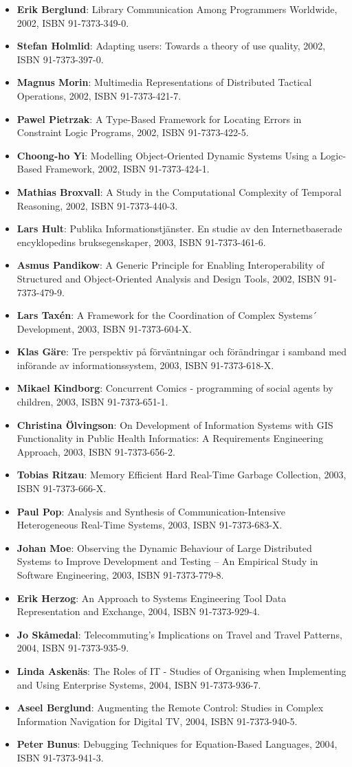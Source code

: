 \documentclass[a4paper,showtrims,twocolumn]{memoir}
\newenvironment{theses}
  {
    \begin{itemize}
      \setlength{\itemsep}{0.2em}
      \setlength{\parskip}{0em}
      \setlength{\parsep}{0em}
  }
  {
    \end{itemize}
  }
\newcommand{\thesis}[5]{\item[No. #1] \textbf{#2}: #3, #4, ISBN #5.}
\begin{document}
\begin{theses}
    \thesis{758}{Erik Berglund}{Library Communication Among Programmers Worldwide}{2002}{91-7373-349-0}
    \thesis{765}{Stefan Holmlid}{Adapting users: Towards a theory of use quality}{2002}{91-7373-397-0}
    \thesis{771}{Magnus Morin}{Multimedia Representations of Distributed Tactical Operations}{2002}{91-7373-421-7}
    \thesis{772}{Pawel Pietrzak}{A Type-Based Framework for Locating Errors in Constraint Logic Programs}{2002}{91-7373-422-5}
    \thesis{774}{Choong-ho Yi}{Modelling Object-Oriented Dynamic Systems Using a Logic-Based Framework}{2002}{91-7373-424-1}
    \thesis{779}{Mathias Broxvall}{A Study in the Computational Complexity of Temporal Reasoning}{2002}{91-7373-440-3}
    \thesis{785}{Lars Hult}{Publika Informationstjänster. En studie av den Internetbaserade encyklopedins bruksegenskaper}{2003}{91-7373-461-6}
    \thesis{793}{Asmus Pandikow}{A Generic Principle for Enabling Interoperability of Structured and Object-Oriented Analysis and Design Tools}{2002}{91-7373-479-9}
    \thesis{800}{Lars Taxén}{A Framework for the Coordination of Complex Systems´ Development}{2003}{91-7373-604-X}
    \thesis{808}{Klas Gäre}{Tre perspektiv på förväntningar och förändringar i samband med införande av informationssystem}{2003}{91-7373-618-X}
    \thesis{821}{Mikael Kindborg}{Concurrent Comics - programming of social agents by children}{2003}{91-7373-651-1}
    \thesis{823}{Christina Ölvingson}{On Development of Information Systems with GIS Functionality in Public Health Informatics: A Requirements Engineering Approach}{2003}{91-7373-656-2}
    \thesis{828}{Tobias Ritzau}{Memory Efficient Hard Real-Time Garbage Collection}{2003}{91-7373-666-X}
    \thesis{833}{Paul Pop}{Analysis and Synthesis of Communication-Intensive Heterogeneous Real-Time Systems}{2003}{91-7373-683-X}
    \thesis{852}{Johan Moe}{Observing the Dynamic Behaviour of Large Distributed Systems to Improve Development and Testing – An Empirical Study in Software Engineering}{2003}{91-7373-779-8}
    \thesis{867}{Erik Herzog}{An Approach to Systems Engineering Tool Data Representation and Exchange}{2004}{91-7373-929-4}
    \thesis{869}{Jo Skåmedal}{Telecommuting’s Implications on Travel and Travel Patterns}{2004}{91-7373-935-9}
    \thesis{870}{Linda Askenäs}{The Roles of IT - Studies of Organising when Implementing and Using Enterprise Systems}{2004}{91-7373-936-7}
    \thesis{872}{Aseel Berglund}{Augmenting the Remote Control: Studies in Complex Information Navigation for Digital TV}{2004}{91-7373-940-5}
    \thesis{873}{Peter Bunus}{Debugging Techniques for Equation-Based Languages}{2004}{91-7373-941-3}

\end{theses}
\end{document}
